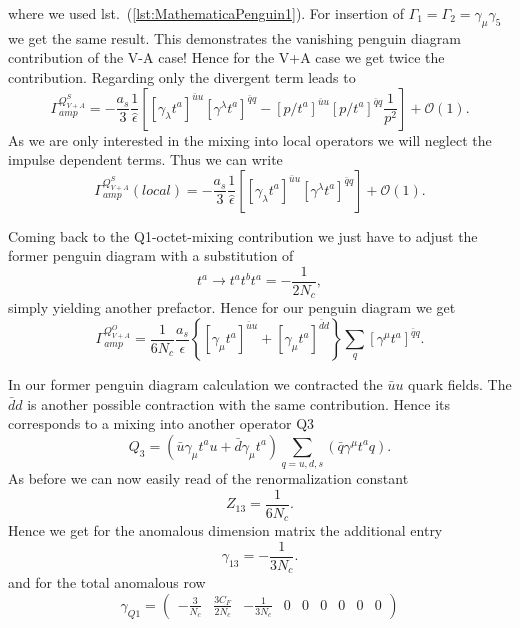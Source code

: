 	where we used lst.~(\ref{lst:MathematicaPenguin1}).
	For insertion of $\Gamma_1=\Gamma_2=\gamma_\mu\gamma_5$ we get the same result. This demonstrates the vanishing penguin diagram contribution of the V-A case! Hence for the V+A case we get twice the contribution. Regarding only the divergent term leads to
	\begin{equation}
		\Gamma^{Q^S_{V+A}}_{amp} = - \frac{a_s}{3}\frac{1}{\hat \epsilon} \left[ [\gamma_\lambda t^a]^{\bar uu} [\gamma^\lambda t^a]^{\bar qq} - [p\!\!\!/ t^a]^{\bar uu} [p\!\!\!/ t^a]^{\bar qq} \frac{1}{p^2} \right] + \mathcal{O}(1).
	\end{equation}
	As we are only interested in the mixing into local operators we will neglect the impulse dependent terms. Thus we can write
	\begin{equation}
		\Gamma^{Q^S_{V+A}}_{amp}(local) = - \frac{a_s}{3}\frac{1}{\hat \epsilon} \left[ [\gamma_\lambda t^a]^{\bar uu} [\gamma^\lambda t^a]^{\bar qq}  \right] + \mathcal{O}(1).
	\end{equation}
	\par
	Coming back to the Q1-octet-mixing contribution we just have to adjust the former penguin diagram with a substitution of 
	\begin{equation}
		t^a \rightarrow t^at^bt^a = -\frac{1}{2N_c},
	\end{equation}
	simply yielding another prefactor. Hence for our penguin diagram we get
	\begin{equation}
		\Gamma^{Q^O_{V+A}}_{amp} = \frac{1}{6N_c} \frac{a_s}{\epsilon} \left\{\left[\gamma_\mu t^a\right]^{\bar uu} + \left[\gamma_\mu t^a\right]^{\bar dd} \right\} \sum_q \left[\gamma^\mu t^a \right]^{\bar qq}.
	 \end{equation}
	\par
	In our former penguin diagram calculation we contracted the $\bar uu$ quark fields. The $\bar dd$ is another possible contraction with the same contribution. Hence its corresponds to a mixing into another operator Q3 	
	\begin{equation}
		Q_3 = (\bar u\gamma_\mu t^a u + \bar d \gamma_\mu t^a) \sum_{q=u,d,s} (\bar q \gamma^\mu t^a q).  	
	\end{equation}
	As before we can now easily read of the renormalization constant
	\begin{equation}
		Z_{13} = \frac{1}{6N_c}. 
	\end{equation}
	Hence we get for the anomalous dimension matrix the additional entry
	\begin{equation}
		\gamma_{13} = -\frac{1}{3 N_c}.
	\end{equation}
	and for the total anomalous row
	\begin{equation}
		\gamma_{Q1} = 
		\begin{pmatrix}
			-\frac{3}{N_c} & \frac{3C_F}{2N_c} & - \frac{1}{3N_c} & 0 & 0 & 0 & 0 & 0 & 0
		\end{pmatrix}
	\end{equation}

